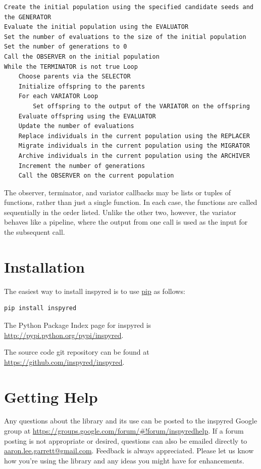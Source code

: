 \documentclass[letterpaper,10pt,english]{sphinxmanual}
\begin{document}
\begin{Verbatim}[commandchars=\\\{\}]
Create the initial population using the specified candidate seeds and the GENERATOR
Evaluate the initial population using the EVALUATOR
Set the number of evaluations to the size of the initial population
Set the number of generations to 0
Call the OBSERVER on the initial population
While the TERMINATOR is not true Loop
    Choose parents via the SELECTOR
    Initialize offspring to the parents
    For each VARIATOR Loop
        Set offspring to the output of the VARIATOR on the offspring
    Evaluate offspring using the EVALUATOR
    Update the number of evaluations
    Replace individuals in the current population using the REPLACER
    Migrate individuals in the current population using the MIGRATOR
    Archive individuals in the current population using the ARCHIVER
    Increment the number of generations
    Call the OBSERVER on the current population
\end{Verbatim}

The observer, terminator, and variator callbacks may be lists or tuples of functions, rather
than just a single function. In each case, the functions are called sequentially in the order
listed. Unlike the other two, however, the variator behaves like a pipeline, where the output
from one call is used as the input for the subsequent call.


\section{Installation}
\label{overview:installation}
The easiest way to install inspyred is to use \href{http://www.pip-installer.org/en/latest/index.html}{pip} as follows:

\begin{Verbatim}[commandchars=\\\{\}]
pip install inspyred
\end{Verbatim}

The Python Package Index page for inspyred is \href{http://pypi.python.org/pypi/inspyred}{http://pypi.python.org/pypi/inspyred}.

The source code git repository can be found at \href{https://github.com/inspyred/inspyred}{https://github.com/inspyred/inspyred}.


\section{Getting Help}
\label{overview:getting-help}
Any questions about the library and its use can be posted to the inspyred Google group at
\href{https://groups.google.com/forum/\#!forum/inspyredhelp}{https://groups.google.com/forum/\#!forum/inspyredhelp}. If a forum posting is not appropriate or desired,
questions can also be emailed directly to \href{mailto:aaron.lee.garrett@gmail.com}{aaron.lee.garrett@gmail.com}. Feedback is always appreciated.
Please let us know how you're using the library and any ideas you might have for enhancements.
\end{document}
